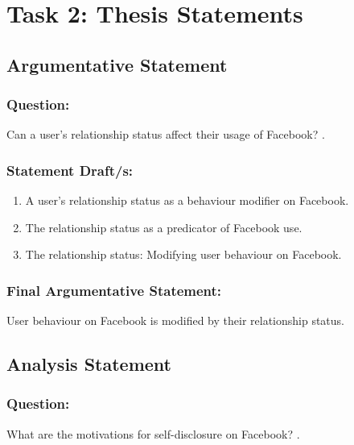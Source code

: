 \documentclass[12pt,a4paper]{report}
\begin{document}
%	

\newpage
\section*{\textsf{Task 2: Thesis Statements}}

\subsection*{\textsf{Argumentative Statement}}

\subsubsection*{\textsf{Question:}}

Can a user's relationship status affect their usage of Facebook? \citep{McAndrew2012}.

\subsubsection*{\textsf{Statement Draft/s:}}
\begin{enumerate}
\item A user's relationship status as a behaviour modifier on Facebook.
\item The relationship status as a predicator of Facebook use.
\item The relationship status: Modifying user behaviour on Facebook.
\end{enumerate}

\subsubsection*{\textsf{Final Argumentative Statement:}}
User behaviour on Facebook is modified by their relationship status.

\subsection*{\textsf{Analysis Statement}}

\subsubsection*{\textsf{Question:}}
What are the motivations for self-disclosure on Facebook? \citep{Park2011}.
\end{document}
